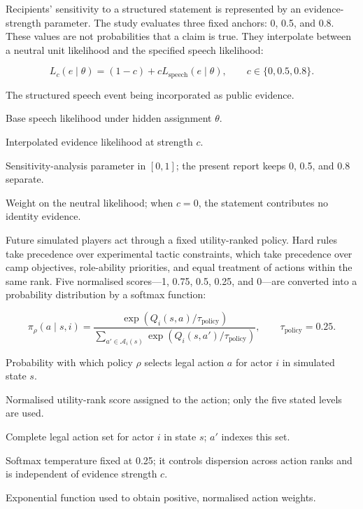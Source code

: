 \documentclass[11pt,a4paper]{article}
\begin{document}
Recipients' sensitivity to a structured statement is represented by an evidence-strength parameter. The study evaluates three fixed anchors: 0, 0.5, and 0.8. These values are not probabilities that a claim is true. They interpolate between a neutral unit likelihood and the specified speech likelihood:

\[
L_c(e\mid\theta)=(1-c)+cL_{\mathrm{speech}}(e\mid\theta),
\qquad c\in\{0,0.5,0.8\}.
\]

\begin{description}[style=nextline,leftmargin=3.4cm,labelwidth=3.0cm]
  \item[$e$] The structured speech event being incorporated as public evidence.
  \item[$L_{\mathrm{speech}}(e\mid\theta)$] Base speech likelihood under hidden assignment $\theta$.
  \item[$L_c(e\mid\theta)$] Interpolated evidence likelihood at strength $c$.
  \item[$c$] Sensitivity-analysis parameter in $[0,1]$; the present report keeps 0, 0.5, and 0.8 separate.
  \item[$1-c$] Weight on the neutral likelihood; when $c=0$, the statement contributes no identity evidence.
\end{description}

Future simulated players act through a fixed utility-ranked policy. Hard rules take precedence over experimental tactic constraints, which take precedence over camp objectives, role-ability priorities, and equal treatment of actions within the same rank. Five normalised scores---1, 0.75, 0.5, 0.25, and 0---are converted into a probability distribution by a softmax function:

\[
\pi_{\rho}(a\mid s,i)=
\frac{\exp(Q_i(s,a)/\tau_{\mathrm{policy}})}
{\sum_{a'\in\mathcal A_i(s)}\exp(Q_i(s,a')/\tau_{\mathrm{policy}})},
\qquad \tau_{\mathrm{policy}}=0.25.
\]

\begin{description}[style=nextline,leftmargin=3.4cm,labelwidth=3.0cm]
  \item[$\pi_{\rho}(a\mid s,i)$] Probability with which policy $\rho$ selects legal action $a$ for actor $i$ in simulated state $s$.
  \item[$Q_i(s,a)$] Normalised utility-rank score assigned to the action; only the five stated levels are used.
  \item[$\mathcal A_i(s)$] Complete legal action set for actor $i$ in state $s$; $a'$ indexes this set.
  \item[$\tau_{\mathrm{policy}}$] Softmax temperature fixed at 0.25; it controls dispersion across action ranks and is independent of evidence strength $c$.
  \item[$\exp$] Exponential function used to obtain positive, normalised action weights.
\end{description}
\end{document}
